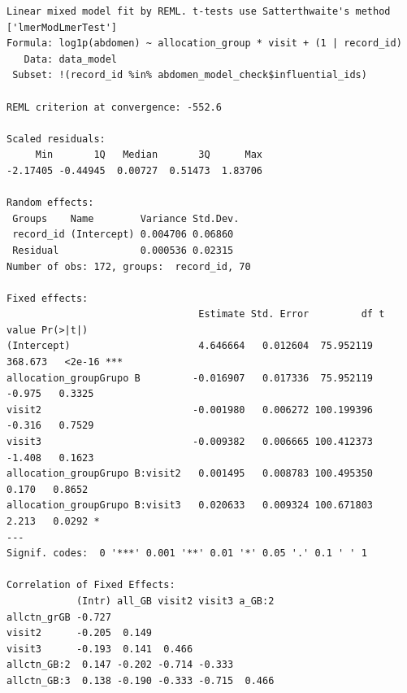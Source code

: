 \documentclass[
  12pt,
]{article}
\newenvironment{Shaded}{\begin{snugshade}}{\end{snugshade}}
\newcommand{\NormalTok}[1]{\textcolor[rgb]{0.00,0.23,0.31}{#1}}
\newcommand{\SpecialCharTok}[1]{\textcolor[rgb]{0.37,0.37,0.37}{#1}}
\begin{document}
\begin{verbatim}
Linear mixed model fit by REML. t-tests use Satterthwaite's method ['lmerModLmerTest']
Formula: log1p(abdomen) ~ allocation_group * visit + (1 | record_id)
   Data: data_model
 Subset: !(record_id %in% abdomen_model_check$influential_ids)

REML criterion at convergence: -552.6

Scaled residuals: 
     Min       1Q   Median       3Q      Max 
-2.17405 -0.44945  0.00727  0.51473  1.83706 

Random effects:
 Groups    Name        Variance Std.Dev.
 record_id (Intercept) 0.004706 0.06860 
 Residual              0.000536 0.02315 
Number of obs: 172, groups:  record_id, 70

Fixed effects:
                                 Estimate Std. Error         df t value Pr(>|t|)    
(Intercept)                      4.646664   0.012604  75.952119 368.673   <2e-16 ***
allocation_groupGrupo B         -0.016907   0.017336  75.952119  -0.975   0.3325    
visit2                          -0.001980   0.006272 100.199396  -0.316   0.7529    
visit3                          -0.009382   0.006665 100.412373  -1.408   0.1623    
allocation_groupGrupo B:visit2   0.001495   0.008783 100.495350   0.170   0.8652    
allocation_groupGrupo B:visit3   0.020633   0.009324 100.671803   2.213   0.0292 *  
---
Signif. codes:  0 '***' 0.001 '**' 0.01 '*' 0.05 '.' 0.1 ' ' 1

Correlation of Fixed Effects:
            (Intr) all_GB visit2 visit3 a_GB:2
allctn_grGB -0.727                            
visit2      -0.205  0.149                     
visit3      -0.193  0.141  0.466              
allctn_GB:2  0.147 -0.202 -0.714 -0.333       
allctn_GB:3  0.138 -0.190 -0.333 -0.715  0.466
\end{verbatim}

\begin{Shaded}
\end{Shaded}
\end{document}

